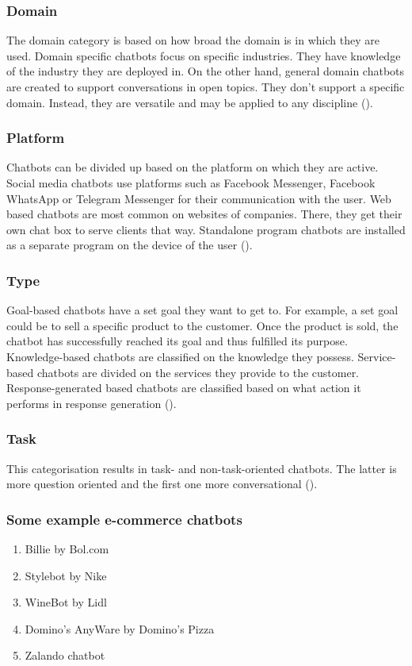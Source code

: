 \subsubsection{Domain}
The domain category is based on how broad the domain is in which they are used. Domain specific chatbots focus on specific industries. They have knowledge of the industry they are deployed in. On the other hand, general domain chatbots are created to support conversations in open topics. They don’t support a specific domain. Instead, they are versatile and may be applied to any discipline (\cite{Maroengsit2019}).

\subsubsection{Platform}
Chatbots can be divided up based on the platform on which they are active. Social media chatbots use platforms such as Facebook Messenger, Facebook WhatsApp or Telegram Messenger for their communication with the user. Web based chatbots are most common on websites of companies. There, they get their own chat box to serve clients that way. Standalone program chatbots are installed as a separate program on the device of the user (\cite{Maroengsit2019}).

\subsubsection{Type}
Goal-based chatbots have a set goal they want to get to. For example, a set goal could be to sell a specific product to the customer. Once the product is sold, the chatbot has successfully reached its goal and thus fulfilled its purpose. Knowledge-based chatbots are classified on the knowledge they possess. Service-based chatbots are divided on the services they provide to the customer. Response-generated based chatbots are classified based on what action it performs in response generation (\cite{Nuruzzaman2018}).

\subsubsection{Task}
This categorisation results in task- and non-task-oriented chatbots. The latter is more question oriented and the first one more conversational (\cite{Nuruzzaman2018}).

\subsubsection{Some example e-commerce chatbots}
\begin{enumerate}
	\item Billie by Bol.com
	\item Stylebot by Nike
	\item WineBot by Lidl
	\item Domino's AnyWare by Domino's Pizza
	\item Zalando chatbot
\end{enumerate}

